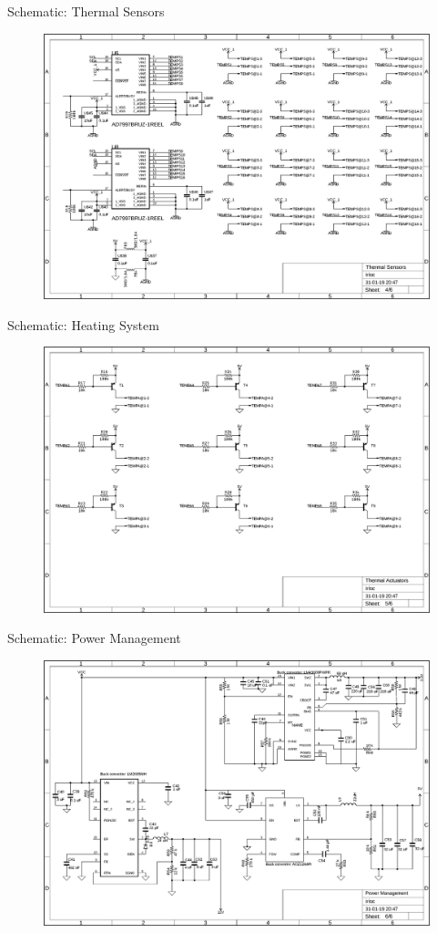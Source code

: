 \documentclass[11pt, aspectratio=169]{beamer}
\begin{document}
\begin{frame}{Schematic: Thermal Sensors}
	\vspace{-.2cm}
	\begin{figure}
		\includegraphics[width=.68\textwidth]{figures/schematics/elec04.png}
	\end{figure}
\end{frame}

\begin{frame}{Schematic: Heating System}
	\vspace{-.2cm}
	\begin{figure}
		\includegraphics[width=.68\textwidth]{figures/schematics/elec05.png}
	\end{figure}
\end{frame}

\begin{frame}{Schematic: Power Management}
	\vspace{-.2cm}
	\begin{figure}
		\includegraphics[width=.68\textwidth]{figures/schematics/elec06.png}
	\end{figure}
\end{frame}
\end{document}
